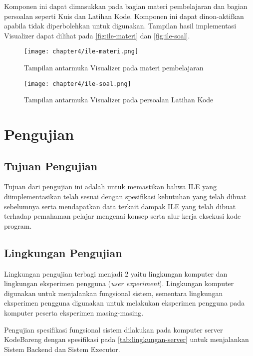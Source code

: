 Komponen ini dapat dimasukkan pada bagian materi pembelajaran dan bagian persoalan seperti Kuis dan Latihan Kode. Komponen ini dapat dinon-aktifkan apabila tidak diperbolehkan untuk digunakan. Tampilan hasil implementasi Visualizer dapat dilihat pada \autoref{fig:ile-materi} dan \autoref{fig:ile-soal}.

\begin{figure}[H]
  \centering
  \texttt{[image: chapter4/ile-materi.png]}
  \caption{Tampilan antarmuka Visualizer pada materi pembelajaran} \label{fig:ile-materi}
\end{figure}
\begin{figure}[H]
  \centering
  \texttt{[image: chapter4/ile-soal.png]}
  \caption{Tampilan antarmuka Visualizer pada persoalan Latihan Kode} \label{fig:ile-soal}
\end{figure}

\section{Pengujian}

\subsection{Tujuan Pengujian}
Tujuan dari pengujian ini adalah untuk memastikan bahwa ILE yang diimplementasikan telah sesuai dengan spesifikasi kebutuhan yang telah dibuat sebelumnya serta mendapatkan data terkait dampak ILE yang telah dibuat terhadap pemahaman pelajar mengenai konsep serta alur kerja eksekusi kode program.

\subsection{Lingkungan Pengujian}
Lingkungan pengujian terbagi menjadi 2 yaitu lingkungan komputer dan lingkungan eksperimen pengguna (\textit{user experiment}). Lingkungan komputer digunakan untuk menjalankan fungsional sistem, sementara lingkungan eksperimen pengguna digunakan untuk melakukan eksperimen pengguna pada komputer peserta eksperimen masing-masing.

Pengujian spesifikasi fungsional sistem dilakukan pada komputer server KodeBareng dengan spesifikasi pada \autoref{tab:lingkungan-server} untuk menjalankan Sistem Backend dan Sistem Executor.

